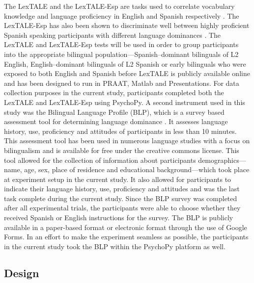 The LexTALE and the LexTALE-Esp are tasks used to correlate vocabulary knowledge and language proficiency in English and Spanish respectively \parencite{Izura2014-yw,Lemhofer2012-hz}. The LexTALE-Esp has also been shown to discriminate well between highly proficient Spanish speaking participants with different language dominances \parencite{Ferre2017-jq}. The LexTALE and LexTALE-Esp tests will be used in order to group participants into the appropriate bilingual population—Spanish–dominant bilinguals of L2 English, English–dominant bilinguals of L2 Spanish or early bilinguals who were exposed to both English and Spanish before %
LexTALE is publicly available online and has been designed to run in PRAAT, Matlab and Presentations. For data collection purposes in the current study, participants completed both the LexTALE and LexTALE-Esp using PsychoPy. 
A second instrument used in this study was the Bilingual Language Profile (BLP), which is a survey based assessment tool for determining language dominance \parencite{Birdsong2012-wd}. It assesses language history, use, proficiency and attitudes of participants in less than 10 minutes. This assessment tool has been used in numerous language studies with a focus on bilingualism and is available for free under the creative commons license. This tool allowed for the collection of information about participants demographics---name, age, sex, place of residence and educational background---which took place at experiment setup in the current study. It also allowed for participants to indicate their language history, use, proficiency and attitudes and was the last task complete during the current study. Since the BLP survey was completed after all experimental trials, the participants were able to choose whether they received Spanish or English instructions for the survey. The BLP is publicly available in a paper-based format or electronic format through the use of Google Forms. In an effort to make the experiment seamless as possible, the participants in the current study took the BLP within the PsychoPy platform as well. 



\subsection{Design}

